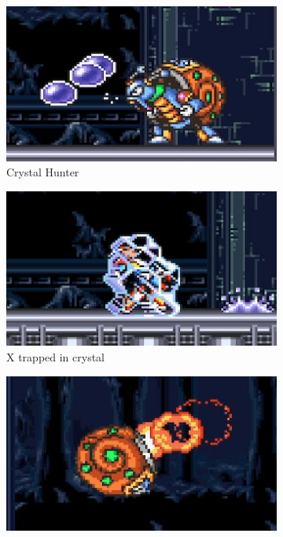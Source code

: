 \begin{figure}
	\centering
	\begin{subfigure}{0.45\linewidth}
		\centering
		\includegraphics[width=\linewidth]{figures/X2/Crystal_snail/Crystal_hunter.png}
		\caption{Crystal Hunter}
	\end{subfigure}
	\begin{subfigure}{0.45\linewidth}
		\centering
		\includegraphics[width=\linewidth]{figures/X2/Crystal_snail/Crystal_trapped_X.png}
		\caption{X trapped in crystal}
	\end{subfigure}
	\begin{subfigure}{0.45\linewidth}
		\centering
		\includegraphics[width=\linewidth]{figures/X2/Crystal_snail/Crystal_shell_jet.png}

\end{subfigure}
\end{figure}
